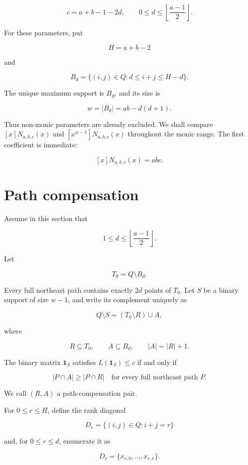 \documentclass[11pt]{article}
\numberwithin{equation}{section}
\begin{document}
\nopagebreak[4]
\[
c=a+b-1-2d,
\qquad
0\le d\le\left\lfloor\frac{a-1}{2}\right\rfloor.
\tag{2.2}
\]

For these parameters, put

\nopagebreak[4]
\[
H=a+b-2
\]

and

\nopagebreak[4]
\[
B_d=\{(i,j)\in Q:d\le i+j\le H-d\}.
\tag{2.3}
\]

The unique maximum support is $B_d$, and its size is

\nopagebreak[4]
\[
w=|B_d|=ab-d(d+1).
\tag{2.4}
\]

Thus non-monic parameters are already excluded. We shall compare
$[x]N_{a,b,c}(x)$ and $[x^{w-1}]N_{a,b,c}(x)$ throughout the monic range.
The first coefficient is immediate:

\nopagebreak[4]
\[
[x]N_{a,b,c}(x)=abc.
\tag{2.5}
\]

\section{Path compensation}


Assume in this section that

\nopagebreak[4]
\[
1\le d\le\left\lfloor\frac{a-1}{2}\right\rfloor.
\]

Let

\nopagebreak[4]
\[
T_0=Q\setminus B_d.
\]

Every full northeast path contains exactly $2d$ points of $T_0$. Let $S$ be
a binary support of size $w-1$, and write its complement uniquely as

\nopagebreak[4]
\[
Q\setminus S=(T_0\setminus R)\cup A,
\tag{3.1}
\]

where

\nopagebreak[4]
\[
R\subseteq T_0,\qquad A\subseteq B_d,\qquad |A|=|R|+1.
\tag{3.2}
\]

The binary matrix $\mathbf1_S$ satisfies $L(\mathbf1_S)\le c$ if and only if

\nopagebreak[4]
\[
|P\cap A|\ge |P\cap R|
\quad\text{for every full northeast path }P.
\tag{3.3}
\]

We call $(R,A)$ a path-compensation pair.

For $0\le r\le H$, define the rank diagonal

\nopagebreak[4]
\[
D_r=\{(i,j)\in Q:i+j=r\}
\]

and, for $0\le r\le d$, enumerate it as

\nopagebreak[4]
\[
D_r=\{x_{r,0},\ldots,x_{r,r}\}.
\]
\end{document}
